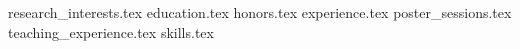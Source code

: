 \documentclass[11pt, a4paper]{awesome-cv}
\newcommand*{\sectiondir}{resume/}
\begin{document}
\makecvheader
{research_interests.tex}
{education.tex}
{honors.tex}
{experience.tex}
{poster_sessions.tex}
{teaching_experience.tex}
{skills.tex}
\end{document}
